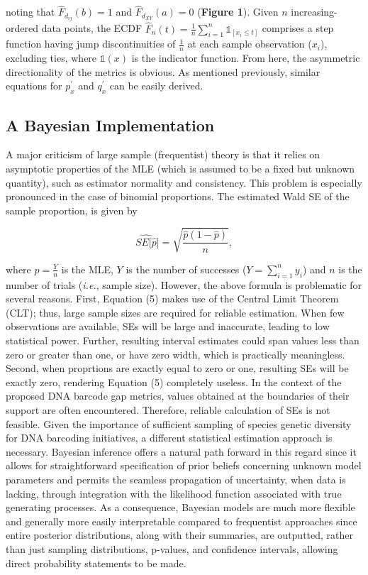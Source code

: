 \documentclass[12pt]{article}
\begin{document}
\noindent noting that $\hat{F}_{d_{ij}}(b) = 1$ and $\hat{F}_{d_{XY}}(a) = 0$ (\textbf{Figure 1}). Given $n$ increasing-ordered data points, the ECDF $\hat{F}_n(t) = \frac{1}{n}\sum_{i = 1}^n\mathds{1}_{[x_i \leq t]}$ comprises a step function having jump discontinuities of $\frac{1}{n}$ at each sample observation ($x_i$), excluding ties, where $\mathds{1}(x)$ is the indicator function. From here, the asymmetric directionality of the metrics is obvious. As mentioned previously, similar equations for $p^{'}_x$ and $q^{'}_x$ can be easily derived.


\subsection{A Bayesian Implementation}

A major criticism of large sample (frequentist) theory is that it relies on asymptotic properties of the MLE (which is assumed to be a fixed but unknown quantity), such as estimator normality and consistency. This problem is especially pronounced in the case of binomial proportions. The estimated Wald SE of the sample proportion, is given by 

\begin{equation}
\widehat{SE[\hat{p}}] = \sqrt{\frac{\hat{p}(1 - \hat{p})}{n}},
\end{equation}

\noindent where $\hat{p} = \frac{Y}{n}$ is the MLE, $Y$ is the number of successes ($Y = \sum_{i=1}^n{y_i}$) and $n$ is the number of trials (\textit{i.e.}, sample size). However, the above formula is problematic for several reasons. First, Equation (5) makes use of the Central Limit Theorem (CLT); thus, large sample sizes are required for reliable estimation. When few observations are available, SEs will be large and inaccurate, leading to low statistical power. Further, resulting interval estimates could span values less than zero or greater than one, or have zero width, which is practically meaningless. Second, when proprtions are exactly equal to zero or one, resulting SEs will be exactly zero, rendering Equation (5) completely useless. In the context of the proposed DNA barcode gap metrics, values obtained at the boundaries of their support are often encountered. Therefore, reliable calculation of SEs is not feasible. Given the importance of sufficient sampling of species genetic diversity for DNA barcoding initiatives, a different statistical estimation approach is necessary. Bayesian inference offers a natural path forward in this regard since it allows for straightforward specification of prior beliefs concerning unknown model parameters and permits the seamless propagation of uncertainty, when data is lacking, through integration with the likelihood function associated with true generating processes. As a consequence, Bayesian models are much more flexible and generally more easily interpretable compared to frequentist approaches since entire posterior distributions, along with their summaries, are outputted, rather than just sampling distributions, p-values, and confidence intervals, allowing direct probability statements to be made. 
\end{document}
